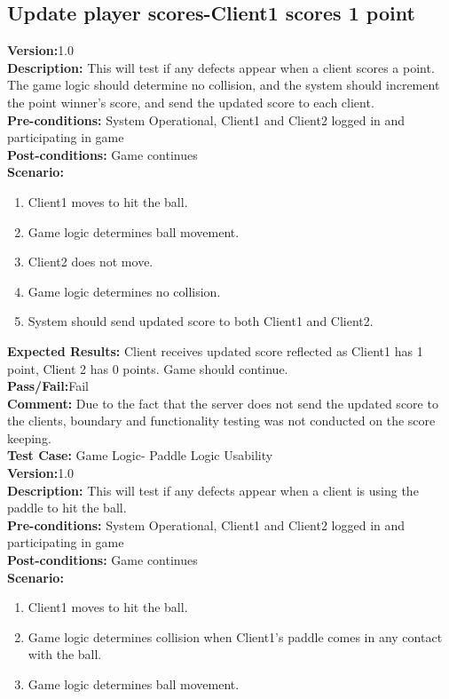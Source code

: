 \documentclass[12pt]{article}
\begin{document}
\subsection{ Update player scores-Client1 scores 1 point}
\textbf{Version:}1.0\\
\textbf{Description:} This will test if any defects appear when a client scores a point. The game logic should determine no collision, and the system should increment the point winner's score, and send the updated score to each client.\\
\textbf{Pre-conditions:} System Operational, Client1 and Client2 logged in and participating in game \\
\textbf{Post-conditions:} Game continues\\
\textbf{Scenario:}
\begin{enumerate}
\item Client1 moves to hit the ball.\\
\item Game logic determines ball movement.\\
\item Client2 does not move.\\
\item Game logic determines no collision. \\
\item System should send updated score to both Client1 and Client2.\\
\end{enumerate}
\textbf{Expected Results:} Client receives updated score reflected as Client1 has 1 point, Client 2 has 0 points. Game should continue.\\
\textbf{Pass/Fail:}Fail\\
\textbf{Comment:} Due to the fact that the server does not send the updated score to the clients, boundary and functionality testing was not conducted on the score keeping.\\
\noindent \textbf{Test Case:} Game Logic- Paddle Logic Usability\\
\textbf{Version:}1.0\\
\textbf{Description:} This will test if any defects appear when a client is using the paddle to hit the ball.\\
\textbf{Pre-conditions:} System Operational, Client1 and Client2 logged in and participating in game \\
\textbf{Post-conditions:} Game continues\\
\textbf{Scenario:}
\begin{enumerate}
\item Client1 moves to hit the ball.\\
\item Game logic determines collision when Client1's paddle comes in any contact with the ball. \\
\item Game logic determines ball movement.\\
\end{enumerate}
\end{document}
